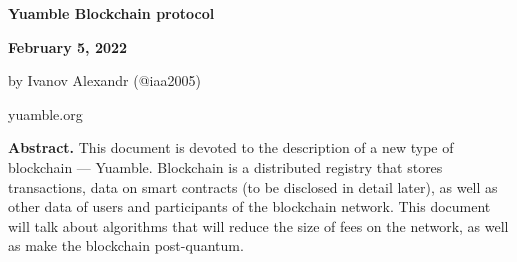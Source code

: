 \documentclass[11pt]{article}
\begin{document}
\begin{center}
{\Large \textbf{Yuamble Blockchain protocol}}
\end{center}
\vspace{-7mm}

\begin{center}
\textbf{February 5, 2022}
\end{center}
\vspace{-7mm}

\begin{center}
by Ivanov Alexandr (@iaa2005)
\end{center}
\vspace{-7mm}

\begin{center}
yuamble.org
\end{center}

\vspace{1\baselineskip}

\textbf{Abstract.}
This document is devoted to the description of a new type of blockchain — Yuamble. Blockchain is a distributed registry that stores transactions, data on smart contracts (to be disclosed in detail later), as well as other data of users and participants of the blockchain network. This document will talk about algorithms that will reduce the size of fees on the network, as well as make the blockchain post-quantum.

\vspace{1\baselineskip}
\end{document}
